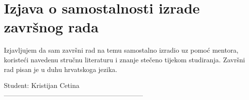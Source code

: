 \chapter*{Izjava o samostalnosti izrade završnog rada}
Izjavljujem da sam završni rad na temu \textbf{\emph{\naslovRada}} samostalno izradio uz pomoć mentora,  koristeći navedenu stručnu literaturu i znanje stečeno tijekom studiranja.
Završni rad pisan je u duhu hrvatskoga jezika.
\vspace{\fill}
\begin{flushright}
Student: Kristijan Cetina\\
\vspace{15mm}
--------------------------------------------------------------
\end{flushright}